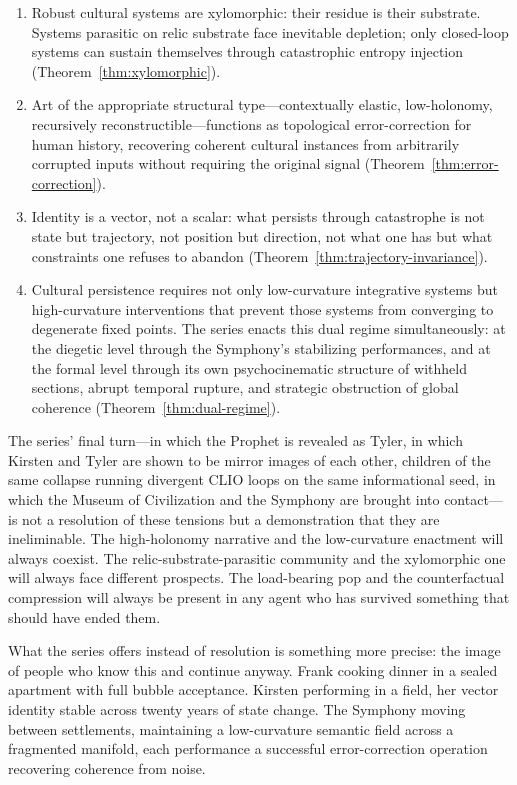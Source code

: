 \documentclass[12pt, oneside]{article}
\theoremstyle{plain}
\theoremstyle{definition}
\theoremstyle{remark}
\begin{document}
\begin{enumerate}
  \item Robust cultural systems are xylomorphic: their residue is
  their substrate. Systems parasitic on relic substrate face
  inevitable depletion; only closed-loop systems can sustain
  themselves through catastrophic entropy injection
  (Theorem~\ref{thm:xylomorphic}).

  \item Art of the appropriate structural type---contextually
  elastic, low-holonomy, recursively reconstructible---functions
  as topological error-correction for human history, recovering
  coherent cultural instances from arbitrarily corrupted inputs
  without requiring the original signal
  (Theorem~\ref{thm:error-correction}).

  \item Identity is a vector, not a scalar: what persists through
  catastrophe is not state but trajectory, not position but
  direction, not what one has but what constraints one refuses to
  abandon (Theorem~\ref{thm:trajectory-invariance}).

  \item Cultural persistence requires not only low-curvature
  integrative systems but high-curvature interventions that prevent
  those systems from converging to degenerate fixed points.
  The series enacts this dual regime simultaneously: at the diegetic
  level through the Symphony's stabilizing performances, and at
  the formal level through its own psychocinematic structure of
  withheld sections, abrupt temporal rupture, and strategic
  obstruction of global coherence (Theorem~\ref{thm:dual-regime}).
\end{enumerate}

The series' final turn---in which the Prophet is revealed as Tyler,
in which Kirsten and Tyler are shown to be mirror images of each
other, children of the same collapse running divergent CLIO loops
on the same informational seed, in which the Museum of Civilization
and the Symphony are brought into contact---is not a resolution of
these tensions but a demonstration that they are ineliminable. The
high-holonomy narrative and the low-curvature enactment will always
coexist. The relic-substrate-parasitic community and the xylomorphic
one will always face different prospects. The load-bearing pop and
the counterfactual compression will always be present in any agent
who has survived something that should have ended them.

What the series offers instead of resolution is something more
precise: the image of people who know this and continue anyway.
Frank cooking dinner in a sealed apartment with full bubble
acceptance. Kirsten performing in a field, her vector identity
stable across twenty years of state change. The Symphony moving
between settlements, maintaining a low-curvature semantic field
across a fragmented manifold, each performance a successful
error-correction operation recovering coherence from noise.
\end{document}
